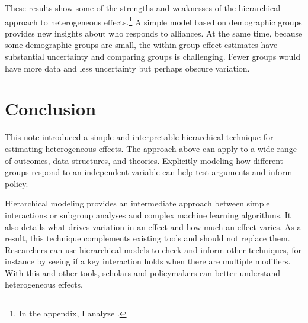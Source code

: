 \documentclass[12pt]{article}
\begin{document}
These results show some of the strengths and weaknesses of the hierarchical approach to heterogeneous effects.\footnote{In the appendix, I analyze \citet{BushPrather2020}.}
A simple model based on demographic groups provides new insights about who responds to alliances. 
At the same time, because some demographic groups are small, the within-group effect estimates have substantial uncertainty and comparing groups is challenging. 
Fewer groups would have more data and less uncertainty but perhaps obscure variation.


\section{Conclusion}

This note introduced a simple and interpretable hierarchical technique for estimating heterogeneous effects. 
The approach above can apply to a wide range of outcomes, data structures, and theories. 
Explicitly modeling how different groups respond to an independent variable can help test arguments and inform policy.  


Hierarchical modeling provides an intermediate approach between simple interactions or subgroup analyses and complex machine learning algorithms. 
It also details what drives variation in an effect and how much an effect varies. 
As a result, this technique complements existing tools and should not replace them. 
Researchers can use hierarchical models to check and inform other techniques, for instance by seeing if a key interaction holds when there are multiple modifiers. 
With this and other tools, scholars and policymakers can better understand heterogeneous effects.


\singlespace
 


%
\end{document}

